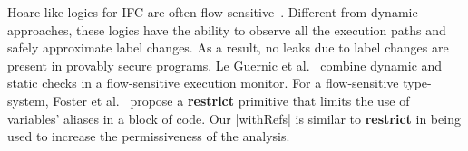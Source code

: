 Hoare-like logics for IFC are often
flow-sensitive~\citep[e.g.][]{Amtoft:2006,Nanevski:2011}. Different from dynamic
approaches, these logics have the ability to observe all the execution paths and
safely approximate label changes. As a result, no leaks due to label changes are
present in provably secure programs.
Le Guernic et al.~\citep{LeGuernic:2006,Guernic:2007:ACM} combine dynamic and
static checks in a flow-sensitive execution monitor.
%
For a flow-sensitive type-system, Foster et
al.~\cite{Foster:2002:FTQ:512529.512531} propose a \textbf{restrict}
primitive that limits the use of variables' aliases in a block of
code. Our |withRefs| is similar to \textbf{restrict} in being used to
increase the permissiveness of the analysis.




 



